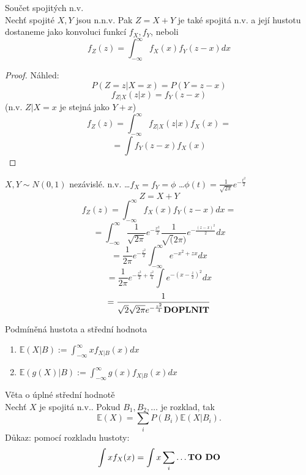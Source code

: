 \documentclass[../main.tex]{subfiles}
\begin{document}
\begin{theorem}
    Součet spojitých n.v.\\

    Nechť spojité $X,Y$ jsou n.n.v. Pak $Z = X+Y$ je také spojitá n.v. a její hustotu dostaneme jako konvoluci funkcí $f_X,f_Y$, neboli
    \[f_Z(z) = \int^\infty_{-\infty}f_X(x)f_Y(z-x)dx\]
    \begin{proof}
        Náhled: \[P(Z=z | X=x) = P(Y = z-x)\]
        \[f_{Z|X}(z|x) = f_Y(z-x)\]
        (n.v. $Z|X=x$ je stejná jako $Y+x$)
        \[f_Z(z) = \int^\infty_{-\infty} f_{Z|X} (z|x)f_X(x) =\]
        \[=\int f_Y(z-x)f_X(x)\]
    \end{proof}
\end{theorem}

\begin{example}
    $X,Y \sim N(0,1)$ nezávislé. n.v. \dots $f_X = f_Y = \phi$ \dots $\phi(t) = \frac{1}{\sqrt{2\pi}}e^{-\frac{t^2}{2}}$
    \[Z = X+Y\]
    \[f_Z(z) = \int^\infty_{-\infty} f_X(x)f_Y(z-x)dx=\]
    \[= \int^\infty_{-\infty} \frac{1}{\sqrt{2\pi}} e^{-\frac{x^2}{2}} \frac{1}{\sqrt(2\pi)}e^{-\frac{(z-x)^2}{2}}dx\]
    \[= \frac{1}{2\pi} e^{-\frac{z^2}{2}}\int^\infty_{-\infty}e^{-x^2 + zx}dx\]
    \[= \frac{1}{2\pi} e^{-\frac{z^2}{2}+\frac{z^2}{4}} \int e^{-(x-\frac{z}{2})^2}dx\]
    \[= \frac{1}{\sqrt{2}\sqrt{2\pi} e^{-\frac{z^2}{4}} \text{\textbf{DOPLNIT}}}\]
\end{example}

\begin{definition}
    Podmíněná hustota a střední hodnota\\

    \begin{enumerate}
        \item $\mathbb{E}(X|B) := \int^\infty_{-\infty} xf_{X|B}(x)dx$
        \item $\mathbb{E}(g(X)|B):=\int^\infty_{-\infty}g(x)f_{X|B}(x)dx$
    \end{enumerate}
\end{definition}
\begin{theorem}
    Věta o úplné střední hodnotě\\

    Nechť $X$ je spojitá n.v.. Pokud $B_1,B_2,\dots$ je rozklad, tak
    \[\mathbb{E}(X) = \sum_i P(B_i)\mathbb{E}(X|B_i).\]
    Důkaz: pomocí rozkladu hustoty:
    \[\int xf_X(x) = \int x\sum_i \dots \text{\textbf{TO DO}}\]
\end{theorem}
\end{document}
